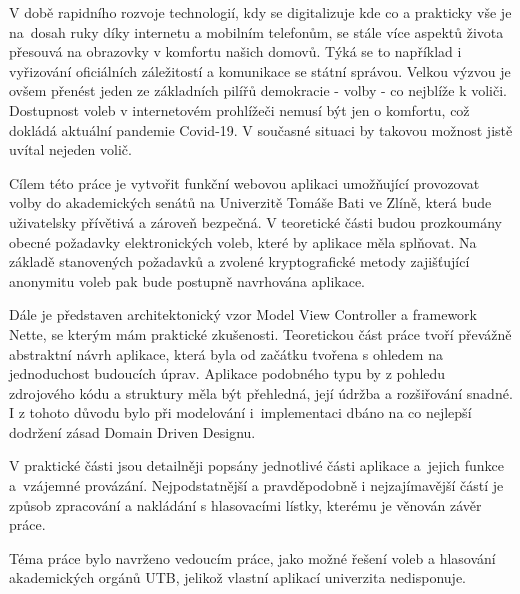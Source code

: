 
V době rapidního rozvoje technologií, kdy se digitalizuje kde co a prakticky vše je na~dosah ruky díky internetu a mobilním telefonům, se stále více aspektů života přesouvá na obrazovky v komfortu našich domovů. Týká se to například i vyřizování oficiálních záležitostí a komunikace se státní správou. Velkou výzvou je ovšem přenést jeden ze základních pilířů demokracie - volby - co nejblíže k voliči. Dostupnost voleb v internetovém prohlížeči nemusí být jen o komfortu, což dokládá aktuální pandemie Covid-19. V současné situaci by takovou možnost jistě uvítal nejeden volič.

\bigskip

Cílem této práce je vytvořit funkční webovou aplikaci umožňující provozovat volby do akademických senátů na Univerzitě Tomáše Bati ve Zlíně, která bude uživatelsky přívětivá a zároveň bezpečná. V teoretické části budou prozkoumány obecné požadavky elektronických voleb, které by aplikace měla splňovat. Na základě stanovených požadavků a zvolené kryptografické metody zajišťující anonymitu voleb pak bude postupně navrhována aplikace.

Dále je představen architektonický vzor Model View Controller a framework Nette, se kterým mám praktické zkušenosti. Teoretickou část práce tvoří převážně abstraktní návrh aplikace, která byla od začátku tvořena s ohledem na jednoduchost budoucích úprav. Aplikace podobného typu by z pohledu zdrojového kódu a struktury měla být přehledná, její údržba a rozšiřování snadné. I z tohoto důvodu bylo při modelování i~implementaci dbáno na co nejlepší dodržení zásad Domain Driven Designu.

\bigskip

V praktické části jsou detailněji popsány jednotlivé části aplikace a~jejich funkce a~vzájemné provázání. Nejpodstatnější a pravděpodobně i nejzajímavější částí je způsob zpracování a nakládání s hlasovacími lístky, kterému je věnován závěr práce.

Téma práce bylo navrženo vedoucím práce, jako možné řešení voleb a hlasování akademických orgánů UTB, jelikož vlastní aplikací univerzita nedisponuje.


